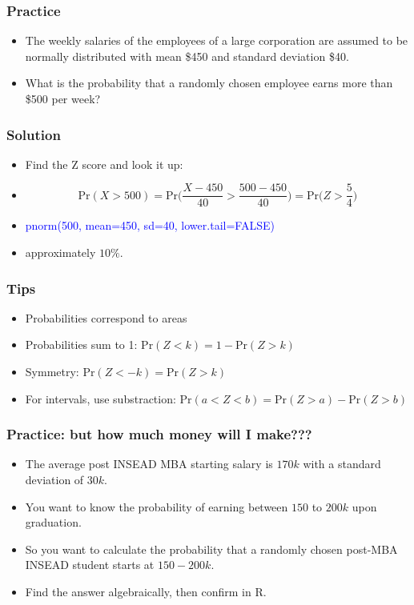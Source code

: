 \documentclass[xcolor=dvipsnames, 9pt]{beamer} %
\begin{document}
\begin{frame}
\frametitle{Practice}
\begin{itemize}
\item The weekly salaries of the employees of a large corporation are assumed to be normally distributed with mean \$450 and standard deviation \$40.
\item What is the probability that a randomly chosen employee earns more than \$500 per week?
\end{itemize}
\end{frame}

\begin{frame}
\frametitle{Solution}
\begin{itemize}
\item Find the Z score and look it up:
\item[] $$ \textrm{Pr}(X > 500) = \textrm{Pr} \bigg( \frac{X - 450}{40} > \frac{500-450}{40} \bigg) = \textrm{Pr} \bigg( Z > \frac{5}{4} \bigg) $$
\vspace{1em}
\item \textcolor{blue}{pnorm(500, mean=450, sd=40, lower.tail=FALSE)}
\item approximately $10\%$.
\end{itemize}
\end{frame}

\begin{frame}
\frametitle{Tips}
\begin{itemize}
	\itemsep\setlength{1em}
\item Probabilities correspond to areas
\item Probabilities sum to 1: $ \textrm{Pr}(Z < k) = 1 - \textrm{Pr}(Z > k) $
\item Symmetry: $\textrm{Pr}(Z < -k) = \textrm{Pr}(Z > k)$
\item For intervals, use substraction: $\textrm{Pr}(a < Z < b) = \textrm{Pr}(Z > a) - \textrm{Pr}(Z > b)$
\end{itemize}
\end{frame}

\begin{frame}
\frametitle{Practice: but how much money will I make??? }
\begin{itemize}
\item The average post INSEAD MBA starting salary is $170k$ with a standard deviation of $30k$. 
\item You want to know the probability of earning between $150$ to $200k$ upon graduation.
\item So you want to calculate the probability that a randomly chosen post-MBA INSEAD student starts at $150-200k$. 
\item Find the answer algebraically, then confirm in \textsf{R}.
\end{itemize}
\end{frame}
\end{document}
